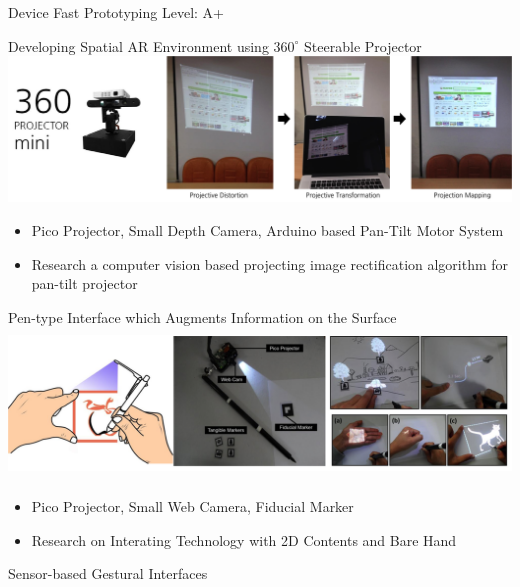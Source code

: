 \begin{cventries}
  \cventry
    {Device Fast Prototyping} %
    {} %
    {} %
    {Level: A+} %
    {
      \begin{cvitems} %
        \item {Developing Spatial AR Environment using $360^{\circ}$ Steerable Projector \\
          \includegraphics[width=\linewidth]{resources/pervasiveAR.png}
          \begin{itemize}
              \item {Pico Projector, Small Depth Camera, Arduino based Pan-Tilt Motor System}
              \item {Research a computer vision based projecting image rectification algorithm for pan-tilt projector}
          \end{itemize}
        }
        \item {Pen-type Interface which Augments Information on the Surface \\
          \includegraphics[width=\linewidth, height=40mm]{resources/augpen.png}
          \begin{itemize}
            \item {Pico Projector, Small Web Camera, Fiducial Marker}
            \item {Research on Interating Technology with 2D Contents and Bare Hand}
          \end{itemize}
        }
        \item {Sensor-based Gestural Interfaces \\
}
\end{cvitems}}
\end{cventries}
